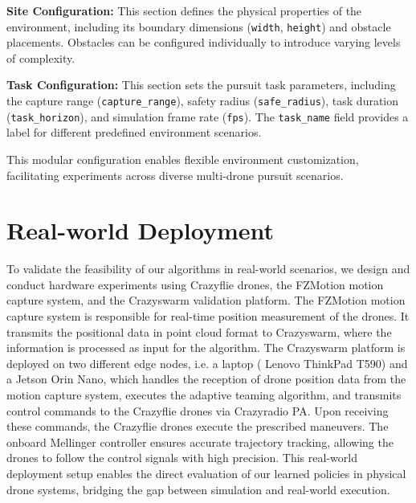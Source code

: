 \textbf{Site Configuration:}  
This section defines the physical properties of the environment, including its boundary dimensions (\texttt{width}, \texttt{height}) and obstacle placements. Obstacles can be configured individually to introduce varying levels of complexity.

\textbf{Task Configuration:}  
This section sets the pursuit task parameters, including the capture range (\texttt{capture\_range}), safety radius (\texttt{safe\_radius}), task duration (\texttt{task\_horizon}), and simulation frame rate (\texttt{fps}). The \texttt{task\_name} field provides a label for different predefined environment scenarios.

This modular configuration enables flexible environment customization, facilitating experiments across diverse multi-drone pursuit scenarios.

\section{Real-world Deployment}
\label{appendix:real}
To validate the feasibility of our algorithms in real-world scenarios, we design and conduct hardware experiments using Crazyflie drones, the FZMotion motion capture system, and the Crazyswarm validation platform.
The FZMotion motion capture system is responsible for real-time position measurement of the drones. It transmits the positional data in point cloud format to Crazyswarm, where the information is processed as input for the algorithm.
The Crazyswarm platform is deployed on two different edge nodes, i.e. a laptop ( Lenovo ThinkPad T590) and a Jetson Orin Nano, which handles the reception of drone position data from the motion capture system, executes the adaptive teaming algorithm, and transmits control commands to the Crazyflie drones via Crazyradio PA. Upon receiving these commands, the Crazyflie drones execute the prescribed maneuvers. The onboard Mellinger controller ensures accurate trajectory tracking, allowing the drones to follow the control signals with high precision.
This real-world deployment setup enables the direct evaluation of our learned policies in physical drone systems, bridging the gap between simulation and real-world execution.

